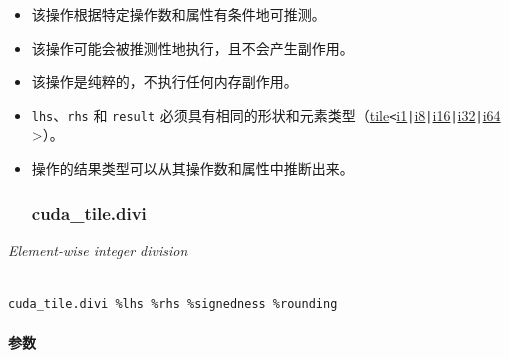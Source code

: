 \documentclass{article}
\begin{document}
\begin{itemize}
\item 该操作根据特定操作数和属性有条件地可推测。
\item 该操作可能会被推测性地执行，且不会产生副作用。
\item 该操作是纯粹的，不执行任何内存副作用。
\item \texttt{lhs}、\texttt{rhs} 和 \texttt{result} 必须具有相同的形状和元素类型（\href{https://docs.nvidia.com/cuda/tile-ir/latest/sections/types.html#type-tile}{tile}\texttt{<}\href{https://docs.nvidia.com/cuda/tile-ir/latest/sections/types.html#subsection-element-types}{i1}\texttt{|}\href{https://docs.nvidia.com/cuda/tile-ir/latest/sections/types.html#subsection-element-types}{i8}\texttt{|}\href{https://docs.nvidia.com/cuda/tile-ir/latest/sections/types.html#subsection-element-types}{i16}\texttt{|}\href{https://docs.nvidia.com/cuda/tile-ir/latest/sections/types.html#subsection-element-types}{i32}\texttt{|}\href{https://docs.nvidia.com/cuda/tile-ir/latest/sections/types.html#subsection-element-types}{i64} >）。
\item 操作的结果类型可以从其操作数和属性中推断出来。




\subsubsection{cuda\_tile.divi}


\end{itemize}
\textit{Element-wise integer division}




\begin{lstlisting}

cuda_tile.divi %lhs %rhs %signedness %rounding

\end{lstlisting}



\paragraph{参数}
\end{document}
